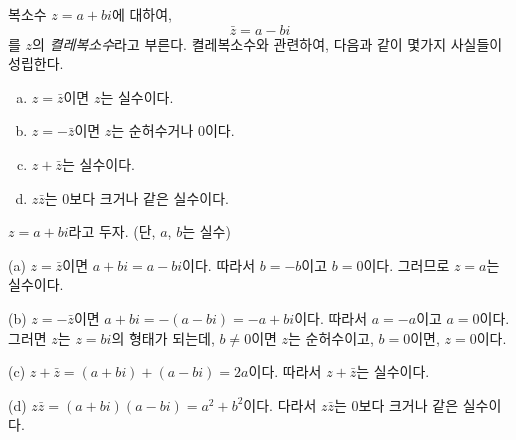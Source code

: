\documentclass{oblivoir}
\newcounter{num}
\begin{document}
\begin{multicols}{2}
복소수 \(z=a+bi\)에 대하여,
\[\bar z=a-bi\]
를 \(z\)의 \emph{켤레복소수}라고 부른다.
켤레복소수와 관련하여, 다음과 같이 몇가지 사실들이 성립한다.
\begin{enumerate}[(a)]\tightlist
\item
\(z=\bar z\)이면 \(z\)는 실수이다.
\item
\(z=-\bar z\)이면 \(z\)는 순허수거나 0이다.
\item
\(z+\bar z\)는 실수이다.
\item
\(z\bar z\)는 0보다 크거나 같은 실수이다.
\end{enumerate}

\(z=a+bi\)라고 두자. (단, \(a\), \(b\)는 실수)

(a) \(z=\bar z\)이면 \(a+bi=a-bi\)이다.
따라서 \(b=-b\)이고 \(b=0\)이다.
그러므로 \(z=a\)는 실수이다.

(b) \(z=-\bar z\)이면 \(a+bi=-(a-bi)=-a+bi\)이다.
따라서 \(a=-a\)이고 \(a=0\)이다.
그러면 \(z\)는 \(z=bi\)의 형태가 되는데, \(b\neq0\)이면 \(z\)는 순허수이고, \(b=0\)이면, \(z=0\)이다.

(c) \(z+\bar z=(a+bi)+(a-bi)=2a\)이다.
따라서 \(z+\bar z\)는 실수이다.

(d) \(z\bar z=(a+bi)(a-bi)=a^2+b^2\)이다.
다라서 \(z\bar z\)는 0보다 크거나 같은 실수이다.
\end{multicols}
\end{document}
